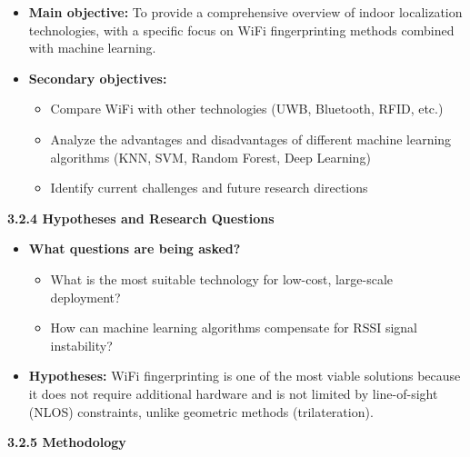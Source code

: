 \documentclass{ipgpmaster}
\begin{document}
\begin{itemize}
    \item \textbf{Main objective:}
 To provide a comprehensive overview of indoor localization technologies, with a specific focus on WiFi fingerprinting methods combined with machine learning. 

    \item \textbf{Secondary objectives:} 
    \begin{itemize}
        \item Compare WiFi with other technologies (UWB, Bluetooth, RFID, etc.) 
        \item Analyze the advantages and disadvantages of different machine learning algorithms (KNN, SVM, Random Forest, Deep Learning) 
        \item Identify current challenges and future research directions 

    \end{itemize}
\end{itemize}
 \textbf{3.2.4  Hypotheses and Research Questions}

\begin{itemize}
    \item \textbf{What questions are being asked?} 
    \begin{itemize}
        \item What is the most suitable technology for low-cost, large-scale deployment? 
        \item How can machine learning algorithms compensate for RSSI signal instability? 


    \end{itemize}
    \item \textbf{Hypotheses:}
 WiFi fingerprinting is one of the most viable solutions because it does not require additional hardware and is not limited by line-of-sight (NLOS) constraints, unlike geometric methods (trilateration).



\end{itemize}
 \textbf{3.2.5  Methodology}
\end{document}

